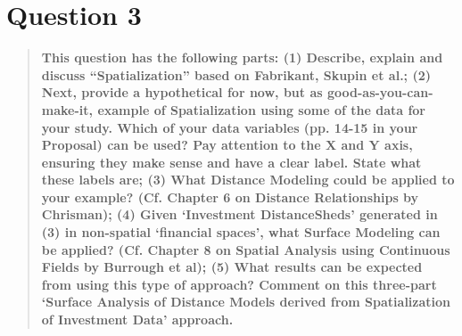 \documentclass[12pt,letterpaper,notitlepage,onecolumn,final,openbib]{article}
\begin{document}
%
%	
%			

\section{Question 3}
\begin{quotation}
	\textbf{This question has the following parts: (1) Describe, explain and discuss ``Spatialization'' based on Fabrikant, Skupin et al.; (2) Next, provide a hypothetical for now, but as good-as-you-can-make-it, example of Spatialization using	some of the data for your study. Which of your data variables (pp. 14-15 in your Proposal) can be used? Pay attention to the X and Y axis, ensuring they make sense and have a clear label. State what these labels are; (3) What Distance Modeling could be applied to your example? (Cf. Chapter 6 on Distance Relationships by Chrisman); (4) Given `Investment DistanceSheds' generated in (3) in non-spatial `financial spaces', what Surface Modeling can be applied? (Cf. Chapter 8 on Spatial Analysis using Continuous Fields by Burrough et al); (5) What results can be expected from using this type of approach? Comment on this three-part `Surface Analysis of Distance Models derived from Spatialization of Investment Data' approach.}
\end{quotation}

\subsection{}
\subsection{}
\subsection{}
\subsection{}
\subsection{}


	\pagebreak
	
	
\end{document}

